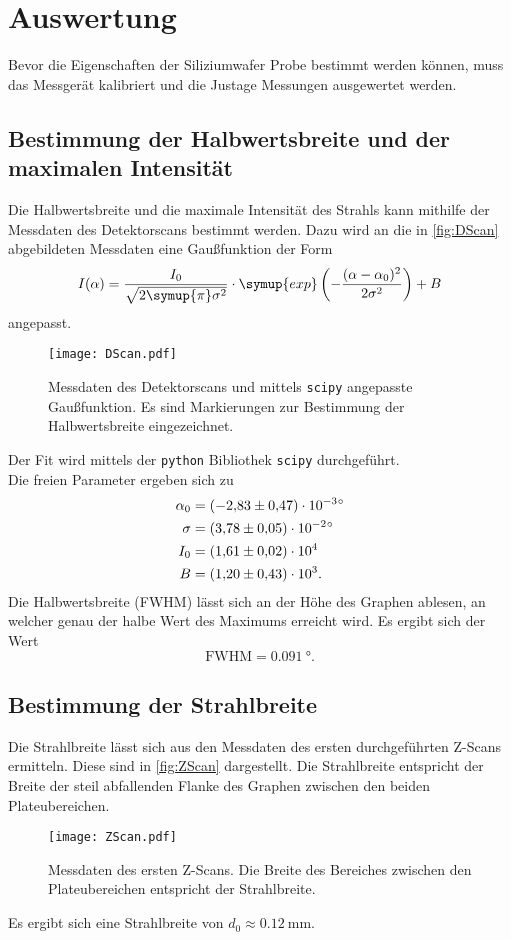 \section{Auswertung}
\label{sec:Auswertung}
Bevor die Eigenschaften der Siliziumwafer Probe bestimmt werden können, muss das Messgerät kalibriert und die Justage Messungen ausgewertet werden.
\subsection{Bestimmung der Halbwertsbreite und der maximalen Intensität}
Die Halbwertsbreite und die maximale Intensität des Strahls kann mithilfe der Messdaten des Detektorscans bestimmt werden.
Dazu wird an die in \autoref{fig:DScan} abgebildeten Messdaten eine Gaußfunktion der Form
\begin{equation*}
  I(\alpha) = \frac{I_0}{\sqrt{2\symup{\pi}\sigma^2}}\cdot \symup{exp}\left(-\frac{(\alpha - \alpha_0)^2}{2\sigma^2}\right) + B
\end{equation*} 
angepasst. 
\begin{figure}
  \centering
  \texttt{[image: DScan.pdf]}
  \caption{Messdaten des Detektorscans und mittels \texttt{scipy} \cite{scipy} angepasste Gaußfunktion. Es sind Markierungen zur Bestimmung der Halbwertsbreite eingezeichnet.}
  \label{fig:DScan}
\end{figure}
Der Fit wird mittels der \texttt{python} Bibliothek \texttt{scipy} \cite{scipy} durchgeführt. \\
Die freien Parameter ergeben sich zu
\begin{align*}
  \alpha_0 &= \qty{-2.83 +-0.47e-3}{\degree} \\
  \sigma &= \qty{3.78 +- 0.05e-2}{\degree} \\
  I_0 &= \num{1.61 +- 0.02e4} \\
  B &= \num{1.20 +- 0.43e3}.
\end{align*}
Die Halbwertsbreite (FWHM) lässt sich an der Höhe des Graphen ablesen, an welcher genau der halbe Wert des Maximums erreicht wird. 
Es ergibt sich der Wert 
\begin{equation*}
  \text{FWHM} = \qty{0.091}{\degree}.
\end{equation*}

\subsection{Bestimmung der Strahlbreite}
Die Strahlbreite lässt sich aus den Messdaten des ersten durchgeführten Z-Scans ermitteln. Diese sind in \autoref{fig:ZScan} dargestellt.
Die Strahlbreite entspricht der Breite der steil abfallenden Flanke des Graphen zwischen den beiden Plateubereichen.
\begin{figure}
  \centering
  \texttt{[image: ZScan.pdf]}
  \caption{Messdaten des ersten Z-Scans. Die Breite des Bereiches zwischen den Plateubereichen entspricht der Strahlbreite.}
  \label{fig:ZScan}
\end{figure}
Es ergibt sich eine Strahlbreite von $d_0 \approx \qty{0.12}{\milli\metre}$. 

